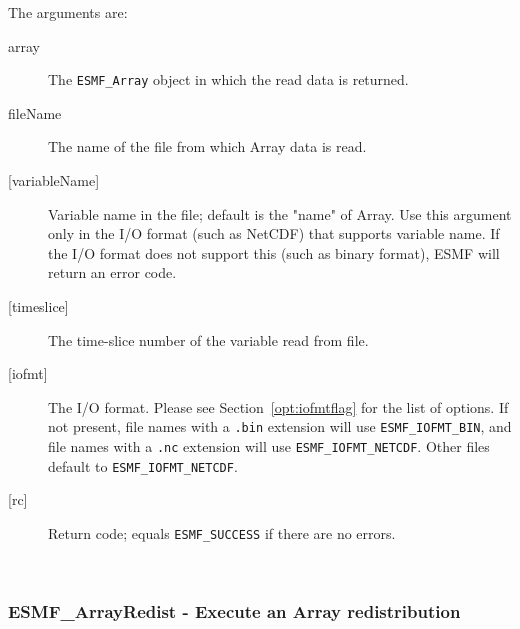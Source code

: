     The arguments are:
    \begin{description}
     \item[array]
      The {\tt ESMF\_Array} object in which the read data is returned.
     \item[fileName]
      The name of the file from which Array data is read.
     \item[{[variableName]}]
      Variable name in the file; default is the "name" of Array.
      Use this argument only in the I/O format (such as NetCDF) that
      supports variable name. If the I/O format does not support this
      (such as binary format), ESMF will return an error code.
     \item[{[timeslice]}]
      The time-slice number of the variable read from file.
     \item[{[iofmt]}]
      \begin{sloppypar}
      The I/O format.  Please see Section~\ref{opt:iofmtflag} for the list
      of options. If not present, file names with a {\tt .bin} extension will
      use {\tt ESMF\_IOFMT\_BIN}, and file names with a {\tt .nc} extension
      will use {\tt ESMF\_IOFMT\_NETCDF}.  Other files default to
      {\tt ESMF\_IOFMT\_NETCDF}.
      \end{sloppypar}
     \item[{[rc]}]
      Return code; equals {\tt ESMF\_SUCCESS} if there are no errors.
    \end{description}
   
 
\mbox{}\hrulefill\ 
 
\subsubsection [ESMF\_ArrayRedist] {ESMF\_ArrayRedist - Execute an Array redistribution}


